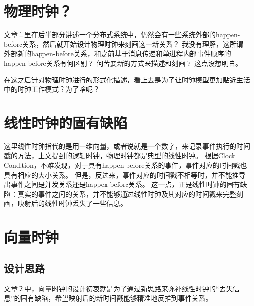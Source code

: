 \documentclass[UTF8]{article}
\begin{document}
\section{物理时钟？}
文章１里在后半部分讲述一个分布式系统中，仍然会有一些系统外部的happen-before关系，然后就开始设计物理时钟来刻画这一新关系？
我没有理解，这所谓外部新的happen-before关系，和之前基于消息传递和单进程内部事件顺序的happen-before关系有何区别？
何苦要新的方式来描述和刻画？
这点没想明白。

在这之后针对物理时钟进行的形式化描述，看上去是为了让时钟模型更加贴近生活中的时钟工作模式？为了啥呢？

\section{线性时钟的固有缺陷}
这里线性时钟指代的是用一维向量，或者说就是一个数字，来记录事件执行的时间戳的方法，上文提到的逻辑时钟，物理时钟都是典型的线性时钟。
根据Clock Condition，不难发现，对于具有happen-before关系的事件，事件对应的时间戳也具有相应的大小关系。
但是，反过来，事件对应的时间戳不相等时，并不能推导出事件之间是并发关系还是happen-before关系。
这一点，正是线性时钟的固有缺陷：真实的事件之间的关系，并不能够通过线性时钟及其对应的时间戳来完整刻画，映射后的线性时钟丢失了一些信息。

\section{向量时钟}
\subsection{设计思路}
文章２中，向量时钟的设计初衷就是为了通过新思路来弥补线性时钟的“丢失信息”的固有缺陷，希望映射后的新时间戳能够精准地反推到事件关系。
\end{document}
